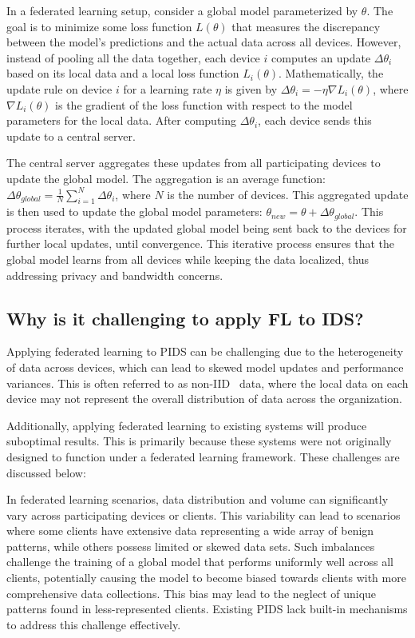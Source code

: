 In a federated learning setup, consider a global model parameterized by \(\theta\). The goal is to minimize some loss function \(L(\theta)\) that measures the discrepancy between the model's predictions and the actual data across all devices. However, instead of pooling all the data together, each device \(i\) computes an update \(\Delta \theta_i\) based on its local data and a local loss function \(L_i(\theta)\). Mathematically, the update rule on device \(i\) for a learning rate \(\eta\) is given by \(\Delta \theta_i = -\eta \nabla L_i(\theta)\), where \(\nabla L_i(\theta)\) is the gradient of the loss function with respect to the model parameters for the local data. After computing \(\Delta \theta_i\), each device sends this update to a central server.

The central server aggregates these updates from all participating devices to update the global model. The aggregation is an average function: \(\Delta \theta_{global} = \frac{1}{N} \sum_{i=1}^{N} \Delta \theta_i\), where \(N\) is the number of devices. This aggregated update is then used to update the global model parameters: \(\theta_{new} = \theta + \Delta \theta_{global}\). This process iterates, with the updated global model being sent back to the devices for further local updates, until convergence. This iterative process ensures that the global model learns from all devices while keeping the data localized, thus addressing privacy and bandwidth concerns.


\subsection{Why is it challenging to apply FL to IDS?}

Applying federated learning to PIDS can be challenging due to the heterogeneity of data across devices, which can lead to skewed model updates and performance variances. This is often referred to as non-IID~\cite{zhao2018federated} data, where the local data on each device may not represent the overall distribution of data across the organization.

Additionally, applying federated learning to existing systems will produce suboptimal results. This is primarily because these systems were not originally designed to function under a federated learning framework. These challenges are discussed below:

 In federated learning scenarios, data distribution and volume can significantly vary across participating devices or clients. This variability can lead to scenarios where some clients have extensive data representing a wide array of benign patterns, while others possess limited or skewed data sets. Such imbalances challenge the training of a global model that performs uniformly well across all clients, potentially causing the model to become biased towards clients with more comprehensive data collections. This bias may lead to the neglect of unique patterns found in less-represented clients. Existing PIDS lack built-in mechanisms to address this challenge effectively.

